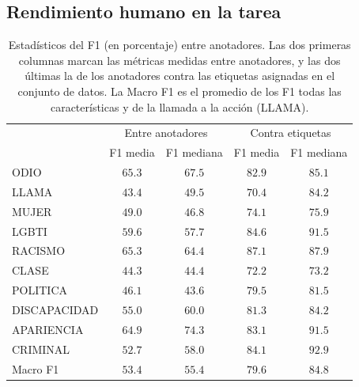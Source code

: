 \subsection{Rendimiento humano en la tarea}


\begin{table}
    \centering
    \begin{tabular}{l cc  cc}
                   & \multicolumn{2}{c}{Entre anotadores} & \multicolumn{2}{c}{Contra etiquetas} \\
        {}         &  F1 media &  F1 mediana  & F1 media  &  F1 mediana \\
        \hline
        ODIO       &  $65.3$ &   $67.5$    & $82.9$   &   $85.1$   \\
        LLAMA      &  $43.4$ &   $49.5$   &  $70.4$   &   $84.2$  \\
        \hline
        MUJER      &  $49.0$ &   $46.8$   &  $74.1$   &   $75.9$  \\
        LGBTI      &  $59.6$ &   $57.7$   &  $84.6$   &   $91.5$  \\
        RACISMO    &  $65.3$ &   $64.4$   &  $87.1$   &   $87.9$  \\
        CLASE      &  $44.3$ &   $44.4$   &  $72.2$   &   $73.2$  \\
        POLITICA   &  $46.1$ &   $43.6$   &  $79.5$   &   $81.5$  \\
        DISCAPACIDAD& $55.0$ &   $60.0$   &  $81.3$   &   $84.2$  \\
        APARIENCIA &  $64.9$ &   $74.3$   &  $83.1$   &   $91.5$  \\
        CRIMINAL   &  $52.7$ &   $58.0$   &  $84.1$   &   $92.9$  \\
        \hline
        Macro F1   &  $53.4$ &   $55.4$   &  $79.6$   &   $84.8$  \\
        \hline
    \end{tabular}

    \caption{Estadísticos del F1 (en porcentaje) entre anotadores. Las dos primeras columnas marcan las métricas medidas entre anotadores, y las dos últimas la de los anotadores contra las etiquetas asignadas en el conjunto de datos. La Macro F1 es el promedio de los F1 todas las características y de la llamada a la acción (LLAMA). }
    \label{tab:ia_f1_scores}
\end{table}


